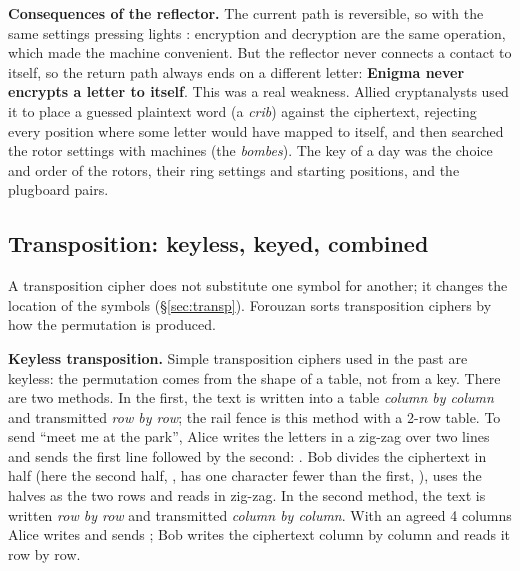 \textbf{Consequences of the reflector.} The current path is reversible, so with the same settings pressing  lights : encryption and decryption are the same operation, which made the machine convenient. But the reflector never connects a contact to itself, so the return path always ends on a different letter: \textbf{Enigma never encrypts a letter to itself}. This was a real weakness. Allied cryptanalysts used it to place a guessed plaintext word (a \emph{crib}) against the ciphertext, rejecting every position where some letter would have mapped to itself, and then searched the rotor settings with machines (the \emph{bombes}). The key of a day was the choice and order of the rotors, their ring settings and starting positions, and the plugboard pairs.

\subsection{Transposition: keyless, keyed, combined \hot}
A transposition cipher does not substitute one symbol for another; it changes the location of the symbols (\S\ref{sec:transp}). Forouzan sorts transposition ciphers by how the permutation is produced.

\textbf{Keyless transposition.} Simple transposition ciphers used in the past are keyless: the permutation comes from the shape of a table, not from a key. There are two methods. In the first, the text is written into a table \emph{column by column} and transmitted \emph{row by row}; the rail fence is this method with a 2-row table. To send ``meet me at the park'', Alice writes the letters in a zig-zag over two lines and sends the first line followed by the second: \textbf{}. Bob divides the ciphertext in half (here the second half, , has one character fewer than the first, ), uses the halves as the two rows and reads in zig-zag. In the second method, the text is written \emph{row by row} and transmitted \emph{column by column}. With an agreed 4 columns Alice writes  and sends \textbf{}; Bob writes the ciphertext column by column and reads it row by row.

